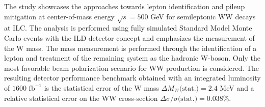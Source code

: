 %

%

 The study showcases the approaches towards lepton identification and pileup mitigation at center-of-mass energy $\sqrt{s} = 500$ GeV for semileptonic WW decays at ILC. The analysis is performed using fully simulated Standard Model Monte Carlo events with the ILD detector concept and emphasizes the measurement of the W mass. The mass measurement is performed through the identification of a lepton and treatment of the remaining system as the hadronic W-boson. Only the most favorable beam polarization scenario for WW production is considered. The resulting detector performance benchmark obtained with an integrated luminosity of $1600 \, \, \text{fb}^{-1}$ is the statistical error of the W mass $\Delta M_W\text{(stat.)} =  2.4 $ MeV and a relative statistical error on the WW cross-section $\Delta \sigma / \sigma \text{(stat.)} = 0.038\% $. 

